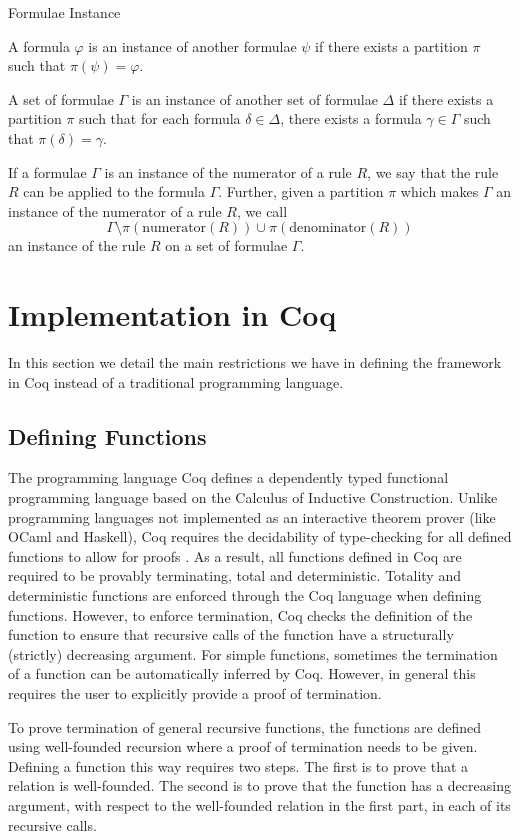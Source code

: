 \documentclass{llncs}
\begin{document}
\begin{definition}{Formulae Instance}\label{Formulae Instance}

A formula $\varphi$ is an instance of another formulae $\psi$ if there exists a
partition $\pi$ such that $\pi(\psi) = \varphi$.

A set of formulae $\Gamma$ is an instance of another set of formulae
$\Delta$ if there exists a partition $\pi$ such that for each formula $\delta
\in \Delta$, there exists a formula $\gamma \in \Gamma$ such that $\pi(\delta)
= \gamma$.

If a formulae $\Gamma$ is an instance of the numerator of a rule $R$, we say
that the rule $R$ can be applied to the formula $\Gamma$. Further, given a
partition $\pi$ which makes $\Gamma$ an instance of the numerator of a rule
$R$, we call
%
$$\Gamma \setminus \pi(\textrm{numerator}(R)) \cup
\pi(\textrm{denominator}(R))$$
%
an instance of the rule $R$ on a set of formulae $\Gamma$.
\end{definition}
%
\section{Implementation in Coq}
%
In this section we detail the main restrictions we have in defining the
framework in Coq instead of a traditional programming language.
%
\subsection{Defining Functions} \label{Defining Functions}
%
The programming language Coq defines a dependently typed functional programming
language based on the Calculus of Inductive Construction. Unlike programming
languages not implemented as an interactive theorem prover (like OCaml and
Haskell), Coq requires the decidability of type-checking for all defined
functions to allow for proofs \cite{barthe2006defining}. As a result, all
functions defined in Coq are required to be provably terminating, total and
deterministic. Totality and deterministic functions are enforced through the
Coq language when defining functions. However, to enforce termination, Coq
checks the definition of the function to ensure that recursive calls of the
function have a structurally (strictly) decreasing argument. For simple
functions, sometimes the termination of a function can be automatically
inferred by Coq. However, in general this requires the user to explicitly
provide a proof of termination.

To prove termination of general recursive functions, the functions are defined
using well-founded recursion where a proof of termination needs to be given.
Defining a function this way requires two steps. The first is to prove that a
relation is well-founded. The second is to prove that the function has a
decreasing argument, with respect to the well-founded relation in the first
part, in each of its recursive calls.
\end{document}
